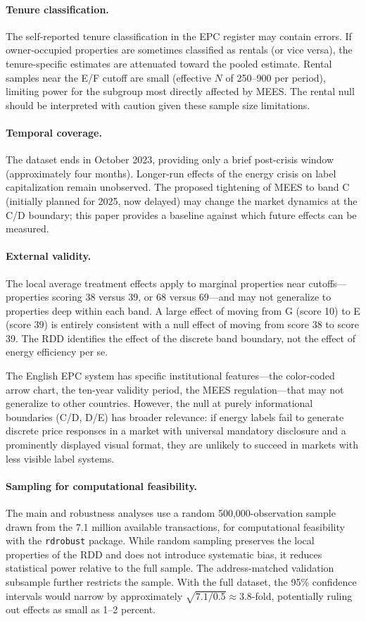 \documentclass[12pt]{article}
\begin{document}
\paragraph{Tenure classification.} The self-reported tenure classification in the EPC register may contain errors. If owner-occupied properties are sometimes classified as rentals (or vice versa), the tenure-specific estimates are attenuated toward the pooled estimate. Rental samples near the E/F cutoff are small (effective $N$ of 250--900 per period), limiting power for the subgroup most directly affected by MEES. The rental null should be interpreted with caution given these sample size limitations.

\paragraph{Temporal coverage.} The dataset ends in October 2023, providing only a brief post-crisis window (approximately four months). Longer-run effects of the energy crisis on label capitalization remain unobserved. The proposed tightening of MEES to band C (initially planned for 2025, now delayed) may change the market dynamics at the C/D boundary; this paper provides a baseline against which future effects can be measured.

\paragraph{External validity.} The local average treatment effects apply to marginal properties near cutoffs---properties scoring 38 versus 39, or 68 versus 69---and may not generalize to properties deep within each band. A large effect of moving from G (score 10) to E (score 39) is entirely consistent with a null effect of moving from score 38 to score 39. The RDD identifies the effect of the discrete band boundary, not the effect of energy efficiency per se.

The English EPC system has specific institutional features---the color-coded arrow chart, the ten-year validity period, the MEES regulation---that may not generalize to other countries. However, the null at purely informational boundaries (C/D, D/E) has broader relevance: if energy labels fail to generate discrete price responses in a market with universal mandatory disclosure and a prominently displayed visual format, they are unlikely to succeed in markets with less visible label systems.

\paragraph{Sampling for computational feasibility.} The main and robustness analyses use a random 500,000-observation sample drawn from the 7.1 million available transactions, for computational feasibility with the \texttt{rdrobust} package. While random sampling preserves the local properties of the RDD and does not introduce systematic bias, it reduces statistical power relative to the full sample. The address-matched validation subsample further restricts the sample. With the full dataset, the 95\% confidence intervals would narrow by approximately $\sqrt{7.1/0.5} \approx 3.8$-fold, potentially ruling out effects as small as 1--2 percent.
\end{document}
